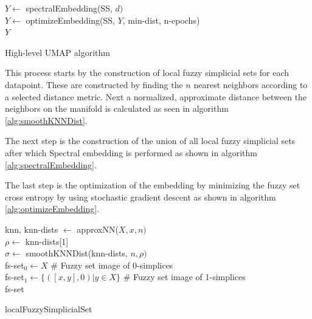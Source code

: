 \documentclass[a4paper, 12pt, twoside]{report}
\begin{document}
\begin{algorithm}[h]
\SetAlgoLined
{}
\bigskip
{}
$Y \leftarrow$ spectralEmbedding(SS, $d)$\\
$Y \leftarrow$ optimizeEmbedding(SS, $Y$, min-dist, n-epochs)\\
\Return $Y$
\caption{High-level UMAP algorithm}
\end{algorithm}
\bigskip
This process starts by the construction of local fuzzy simplicial sets for each datapoint. These are constructed by finding the $n$ nearest neighbors according to a selected distance metric. Next a normalized, approximate distance between the neighbors on the manifold is calculated as seen in algorithm \ref{alg:smoothKNNDist}.

The next step is the construction of the union of all local fuzzy simplicial sets after which Spectral embedding is performed as shown in algorithm \ref{alg:spectralEmbedding}.

The last step is the optimization of the embedding by minimizing the fuzzy set cross entropy by using stochastic gradient descent as shown in algorithm \ref{alg:optimizeEmbedding}.

\begin{algorithm}[h!]
\SetAlgoLined
{}
\bigskip
knn, knn-dists $\leftarrow$ approxNN($X, x, n)$\\
$\rho \leftarrow$ knn-dists[1]\\
$\sigma \leftarrow$ smoothKNNDist(knn-dists, $n, \rho)$\\
fs-set$_{0} \leftarrow X$ # Fuzzy set image of 0-simplices\\
fs-set$_{1} \leftarrow \{([x,y],0) | y \in X\}$ # Fuzzy set image of 1-simplices\\
\Return fs-set
\caption{localFuzzySimplicialSet}
\label{alg:localFuzzySimplicialSet}
\end{algorithm}
\end{document}
